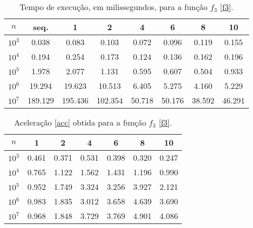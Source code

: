 \documentclass{article}
\begin{document}
        \begin{table}
          \centering
          \begin{tabular}{||c c c c c c c c||}
            \hline
            $n$ & seq. & 1 & 2 & 4 & 6 & 8 & 10 \\ 
            \hline \hline
            $10^{3}$ & 0.038 & 0.083 & 0.103 & 0.072 & 0.096 & 0.119 & 0.155 \\ 
            \hline 
            $10^{4}$ & 0.194 & 0.254 & 0.173 & 0.124 & 0.136 & 0.162 & 0.196 \\ 
            \hline 
            $10^{5}$ & 1.978 & 2.077 & 1.131 & 0.595 & 0.607 & 0.504 & 0.933 \\ 
            \hline 
            $10^{6}$ & 19.294 & 19.623 & 10.513 & 6.405 & 5.275 & 4.160 & 5.229 \\ 
            \hline 
            $10^{7}$ & 189.129 & 195.436 & 102.354 & 50.718 & 50.176 & 38.592 & 46.291 \\ 
            \hline 
          \end{tabular}
          \caption{Tempo de execução, em milissegundos, para a função $f_3$ \eqref{f3}.}
          \label{f3t}
        \end{table}
      
        \begin{table}
          \centering
          \begin{tabular}{||c c c c c c c||}
            \hline
            $n$ & 1 & 2 & 4 & 6 & 8 & 10 \\ 
            \hline \hline
            $10^{3}$ & 0.461 & 0.371 & 0.531 & 0.398 & 0.320 & 0.247 \\ 
            \hline 
            $10^{4}$ & 0.765 & 1.122 & 1.562 & 1.431 & 1.196 & 0.990 \\ 
            \hline 
            $10^{5}$ & 0.952 & 1.749 & 3.324 & 3.256 & 3.927 & 2.121 \\ 
            \hline 
            $10^{6}$ & 0.983 & 1.835 & 3.012 & 3.658 & 4.639 & 3.690 \\ 
            \hline 
            $10^{7}$ & 0.968 & 1.848 & 3.729 & 3.769 & 4.901 & 4.086 \\ 
            \hline 
          \end{tabular}
          \caption{Aceleração \eqref{acc} obtida para a função $f_3$ \eqref{f3}. }
          \label{f3a}
        \end{table}
\end{document}

